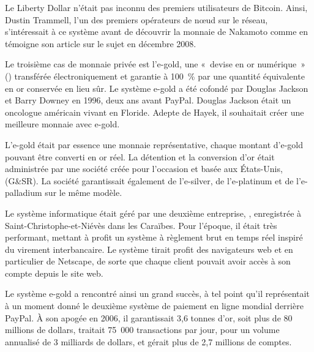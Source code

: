 Le Liberty Dollar n'était pas inconnu des premiers utilisateurs de Bitcoin. Ainsi, Dustin Trammell, l'un des premiers opérateurs de nœud sur le réseau, s'intéressait à ce système avant de découvrir la monnaie de Nakamoto comme en témoigne son article sur le sujet en décembre 2008.


Le troisième cas de monnaie privée est l'e-gold, une «~devise en or numérique~» () transférée électroniquement et garantie à 100~\% par une quantité équivalente en or conservée en lieu sûr. Le système e-gold a été cofondé par Douglas Jackson et Barry Downey en 1996, deux ans avant PayPal. Douglas Jackson était un oncologue américain vivant en Floride. Adepte de Hayek, il souhaitait créer une meilleure monnaie avec e-gold.


L'e-gold était par essence une monnaie représentative, chaque montant d'e-gold pouvant être converti en or réel. La détention et la conversion d'or était administrée par une société créée pour l'occasion et basée aux États-Unis,  (G\&SR). La société garantissait également de l'e-silver, de l'e-platinum et de l'e-palladium sur le même modèle.

Le système informatique était géré par une deuxième entreprise, , enregistrée à Saint-Christophe-et-Niévès dans les Caraïbes. Pour l'époque, il était très performant, mettant à profit un système à règlement brut en temps réel inspiré du virement interbancaire. Le système tirait profit des navigateurs web et en particulier de Netscape, de sorte que chaque client pouvait avoir accès à son compte depuis le site web.

Le système e-gold a rencontré ainsi un grand succès, à tel point qu'il représentait à un moment donné le deuxième système de paiement en ligne mondial derrière PayPal. À son apogée en 2006, il garantissait 3,6 tonnes d'or, soit plus de 80 millions de dollars, traitait 75~000 transactions par jour, pour un volume annualisé de 3 milliards de dollars, et gérait plus de 2,7 millions de comptes.

